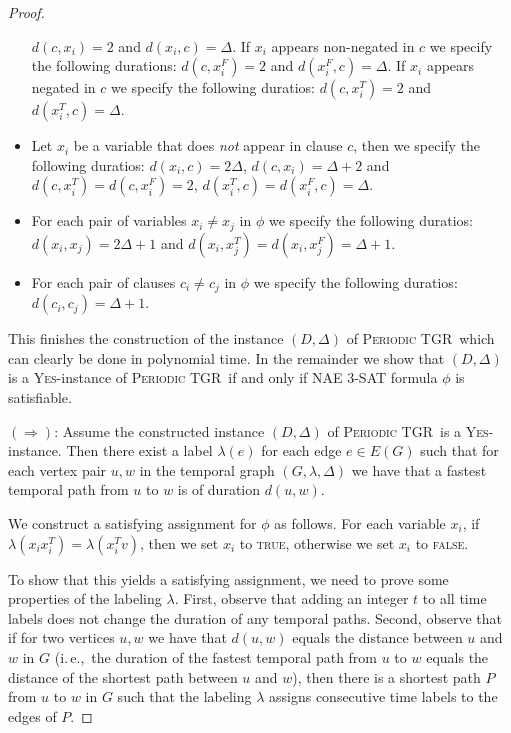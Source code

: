 \documentclass[a4paper,UKenglish,cleveref, autoref, thm-restate]{lipics-v2021}
\newcommand{\ie}{i.\,e.,\ }
\newcommand{\deltaExact}{\textsc{Periodic TGR}}
\begin{document}
\begin{proof}
\begin{itemize}
    $d(c,x_i)=2$ and $d(x_i,c)=\Delta$.
    If $x_i$ appears non-negated in $c$ we specify the following durations:
    $d(c,x_i^F)=2$ and $d(x_i^F,c)=\Delta$.
    If $x_i$ appears negated in $c$ we specify the following duratios:
    $d(c,x_i^T)=2$ and $d(x_i^T,c)=\Delta$.
    \item Let $x_i$ be a variable that does \emph{not} appear in clause $c$, then we specify the following duratios:
    $d(x_i,c)=2 \Delta$, $d(c,x_i)=\Delta + 2$
    and
    $d(c,x_i^T)=d(c,x_i^F)=2$, $d(x_i^T,c)=d(x_i^F,c)=\Delta$. 
    \item For each pair of variables $x_i \neq x_j$ in $\phi$ we specify the following duratios:
    $d(x_i,x_j)=2\Delta +1$ and
    $d(x_i,x_j^T)=d(x_i,x_j^F)=\Delta + 1$.
    \item For each pair of clauses $c_i \neq c_j$ in $\phi$ we specify the following duratios:
    $d(c_i,c_j)= \Delta + 1$.
\end{itemize}
This finishes the construction of the instance $(D,\Delta)$ of \deltaExact\, which can clearly be done in polynomial time. In the remainder we show that $(D,\Delta)$ is a \textsc{Yes}-instance of \deltaExact\ if and only if NAE 3-SAT formula $\phi$ is satisfiable.

$(\Rightarrow)$: Assume the constructed instance $(D,\Delta)$ of \deltaExact\ is a \textsc{Yes}-instance. 
Then there exist a label $\lambda(e)$ for each edge $e\in E(G)$ such that for each vertex pair $u,w$ in the temporal graph $(G,\lambda,\Delta)$ we have that a fastest temporal path from $u$ to $w$ is of duration $d(u,w)$. 

We construct a satisfying assignment for $\phi$ as follows. For each variable $x_i$, 
if $\lambda(x_i x_i^T)=\lambda(x_i^T v)$, then we set $x_i$ to \textsc{true}, otherwise we set $x_i$ to \textsc{false}.

To show that this yields a satisfying assignment, we need to prove some properties of the labeling $\lambda$.
First, observe that adding an integer $t$ to all time labels does not change the duration of any temporal paths. 
Second, observe that if for two vertices $u,w$ we have that $d(u,w)$ equals the distance between $u$ and $w$ in $G$
(\ie the duration of the fastest temporal path from $u$ to $w$ equals the distance of the shortest path between $u$ and $w$), 
then there is a shortest path $P$ from $u$ to $w$ in $G$ such that 
the labeling $\lambda$ assigns consecutive time labels to the edges of $P$.



\end{proof}
\end{document}
